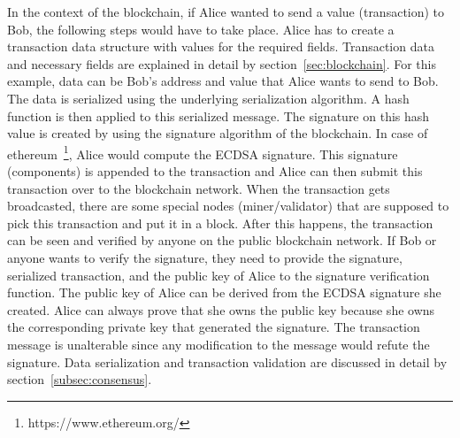 In the context of the blockchain, if Alice wanted to send a value (transaction)
to Bob, the following steps would have to take place. Alice has to create a
transaction data structure with values for the required fields. Transaction
data and necessary fields are explained in detail by
section~\ref{sec:blockchain}. For this example, data can be Bob's address and
value that Alice wants to send to Bob. The data is serialized using the
underlying serialization algorithm. A hash function is then applied to this
serialized message. The signature on this hash value is created by using the
signature algorithm of the blockchain. In case of
ethereum~\footnote{https://www.ethereum.org/}, Alice would compute the ECDSA
signature. This signature (components) is appended to the transaction and Alice
can then submit this transaction over to the blockchain network. When the
transaction gets broadcasted, there are some special nodes (miner/validator)
that are supposed to pick this transaction and put it in a block. After this
happens, the transaction can be seen and verified by anyone on the public
blockchain network. If Bob or anyone wants to verify the signature, they need
to provide the signature, serialized transaction, and the public key of Alice
to the signature verification function. The public key of Alice can be derived
from the ECDSA signature she created. Alice can always prove that she owns the
public key because she owns the corresponding private key that generated the
signature. The transaction message is unalterable since any modification to the
message would refute the signature. Data serialization and transaction
validation are discussed in detail by section~\ref{subsec:consensus}.
